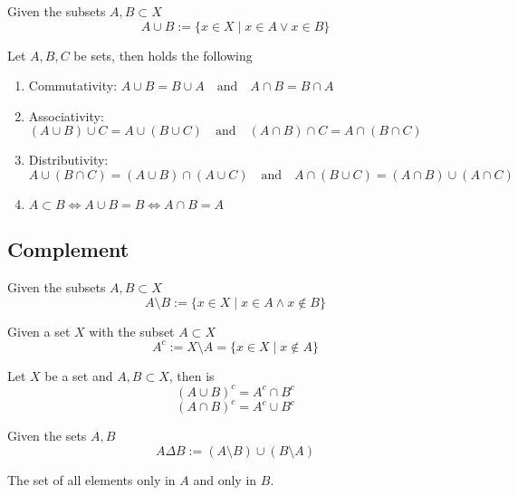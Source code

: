 \begin{definition}[Union]
   Given the subsets \(A, B \subset X\)
   \[A \cup B := \{x \in X \mid x \in A \lor x \in B\}\]
\end{definition}

\begin{proposition}
   Let \(A, B, C\) be sets, then holds the following
   \begin{enumerate}[label=\roman*, align=Center]
      \item Commutativity: \(A \cup B = B \cup A \quad\text{and}\quad A \cap B = B \cap A\)
      \item Associativity: \((A \cup B) \cup C = A \cup (B \cup C) \quad\text{and}\quad (A \cap B) \cap C = A \cap (B \cap C)\)
      \item Distributivity: \(A \cup (B \cap C) = (A \cup B) \cap (A \cup C) \quad\text{and}\quad A \cap (B \cup C) = (A \cap B) \cup (A \cap C)\)
      \item \(A \subset B \iff A \cup B = B \iff A \cap B = A\)
   \end{enumerate}
\end{proposition}

\subsection{Complement}
\begin{definition}
   Given the subsets \(A, B \subset X\)
   \[A \setminus B := \{x \in X \mid x \in A \land x \notin B\}\]
\end{definition}

\begin{definition}
   Given a set \(X\) with the subset \(A \subset X\)
   \[A^c := X \setminus A = \{x \in X \mid x \not\in A\}\]
\end{definition}

\begin{proposition}
   Let \(X\) be a set and \(A, B \subset X\), then is
   \[(A \cup B)^c = A^c \cap B^c\]
   \[(A \cap B)^c = A^c \cup B^c\]
\end{proposition}

\begin{definition}
   Given the sets \(A, B\)
   \[A \Delta B := (A \setminus B) \cup (B \setminus A)\]
\end{definition}
\begin{remark}
   The set of all elements only in \(A\) and only in \(B\).
\end{remark}

